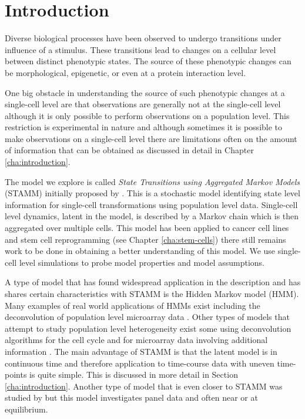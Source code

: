 \section{Introduction}
\label{sec:intro-stamm}

Diverse biological processes have been observed to undergo transitions under influence of a stimulus. These transitions lead to changes on a cellular level between distinct phenotypic states. The source of these phenotypic changes can be morphological, epigenetic, or even at a protein interaction level.

One big obstacle in understanding the source of such phenotypic changes at a single-cell level are that observations are generally not at the single-cell level although it is only possible to perform observations on a population level. This restriction is experimental in nature and although sometimes it is possible to make observations on a single-cell level there are limitations often on the amount of information that can be obtained as discussed in detail in Chapter \ref{cha:introduction}. 

The model we explore is called \emph{State Transitions using Aggregated Markov Models} (STAMM) initially proposed by \cite{Armond:2013}. This is a stochastic model identifying  state level information for single-cell transformations using population level data. Single-cell level dynamics, latent in the model, is described by a Markov chain which is then aggregated over multiple cells. This model has been applied to cancer cell lines  \citep{Casale:2013} and stem cell reprogramming (see Chapter \ref{cha:stem-cells}) there still remains work to be done in obtaining a better understanding of this model. We use single-cell level simulations to probe model properties and model assumptions. 

A type of model that has found widespread application in the description and has shares certain characteristics with STAMM is the Hidden Markov model (HMM). Many examples of real world applications of HMMs exist including the deconvolution of population level microarray data \citep{Roy:2006ik}. Other types of models that attempt to study population level heterogeneity exist some using deconvolution algorithms for the cell cycle and for microarray data involving additional information \citep{Bar-Joseph04082004, BarJoseph:2008bx}. The main advantage of STAMM is that the latent model is in continuous time and therefore application to time-course data with uneven time-points is quite simple. This is discussed in more detail in Section \ref{cha:introduction}. Another type of model that is even closer to STAMM was studied by \cite{Kalbfleisch:1983vd} but this model investigates panel data and often near or at equilibrium. 

